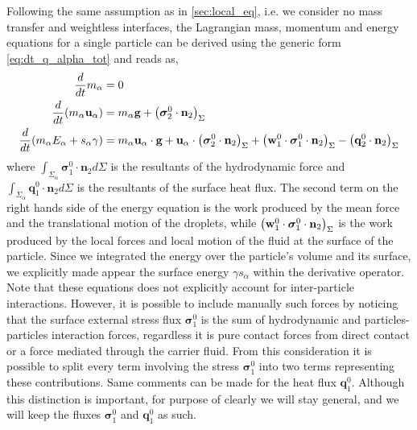 Following the same assumption as in \ref{sec:local_eq}, i.e. we consider no mass transfer and weightless interfaces, the Lagrangian  mass, momentum and energy equations for a single particle can be derived using the generic form \ref{eq:dt_q_alpha_tot} and reads as, 
\begin{align}
    \label{eq:dt_m_alpha}
    \frac{d}{d t} m_\alpha
    &= 
    0\\
    \label{eq:dt_p_alpha}
    \frac{d}{d t} (m_\alpha \textbf{u}_\alpha)
    &= 
    m_\alpha\textbf{g}
    +  \left( \bm{\sigma}_2^0 \cdot \textbf{n}_2 \right)_\Sigma\\
    \label{eq:dt_E_alpha}
    \frac{d}{d t} (m_\alpha E_\alpha + s_\alpha \gamma)
    &= 
    m_\alpha \textbf{u}_\alpha \cdot \textbf{g}
    +\textbf{u}_\alpha \cdot \left( \bm{\sigma}_2^0 \cdot \textbf{n}_2 \right)_\Sigma   
    +\left( \textbf{w}_1^0 \cdot \bm{\sigma}_1^0 \cdot  \textbf{n}_2 \right)_\Sigma 
    - \left( \textbf{q}_2^0 \cdot \textbf{n}_2 \right)_\Sigma
\end{align}
where  $\int_{\Sigma_\alpha}  \bm{\sigma}_1^0 \cdot \textbf{n}_2 d\Sigma$ is the resultants of the hydrodynamic force and $\int_{\Sigma_\alpha} \textbf{q}_1^0 \cdot \textbf{n}_2 d\Sigma$ is the resultants of the surface heat flux. 
The second term on the right hands side of the energy equation is the work produced by the mean force and the translational motion of the droplets, while $\left( \textbf{w}_1^0 \cdot \bm{\sigma}_1^0 \cdot  \textbf{n}_2 \right)_\Sigma$ is the work produced by the local forces and local motion of the fluid at the surface of the particle.
Since we integrated the energy over the particle's volume and its surface, we explicitly made appear the surface energy $\gamma s_\alpha$ within the derivative operator. 
Note that these equations does not explicitly account for inter-particle interactions. 
However, it is possible to include manually such forces by noticing that the surface external stress flux $\bm{\sigma}_1^0$ is the sum of hydrodynamic and particles-particles interaction forces, regardless it is pure contact forces from direct contact or a force mediated through the carrier fluid.
From this consideration it is possible to split every term involving the stress $\bm{\sigma}_1^0$ into two terms representing these contributions. 
Same comments can be made for the heat flux $\textbf{q}_1^0$. 
Although this distinction is important, for purpose of clearly we will stay general, and we will keep the fluxes $\bm{\sigma}_1^0$ and $\textbf{q}_1^0$ as such. 

